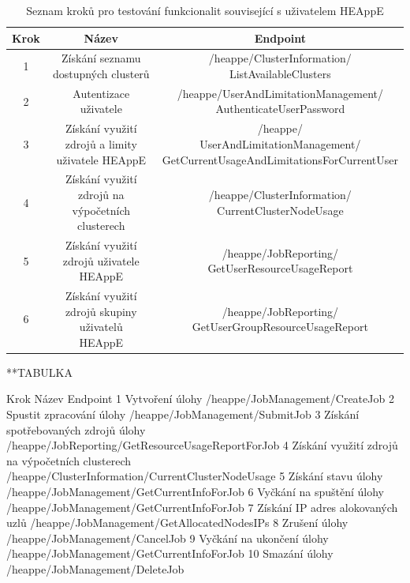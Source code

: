 \begin{table}
	\centering
	\label{tab:TopLevelTableLabel}
		\begin{tabular}{|c|c|c|}
		    \hline
		    Krok & Název & Endpoint \\
		    \hline
			1 & Získání seznamu dostupných clusterů & \specialcell{/heappe/ClusterInformation/\\ListAvailableClusters}\\
			\hline
			2 & Autentizace uživatele & \specialcell{/heappe/UserAndLimitationManagement/\\
			AuthenticateUserPassword}\\
            \hline
			3 & \specialcell{Získání využití zdrojů a limity\\ uživatele HEAppE} & \specialcell{/heappe/\\UserAndLimitationManagement/\\GetCurrentUsageAndLimitationsForCurrentUser}\\
            \hline
            4 & \specialcell{Získání využití zdrojů na výpočetních \\clusterech} & 	\specialcell{/heappe/ClusterInformation/\\CurrentClusterNodeUsage}\\
            \hline
            5 & Získání využití zdrojů uživatele HEAppE & \specialcell{/heappe/JobReporting/\\GetUserResourceUsageReport}\\
            \hline
            6 & \specialcell{Získání využití zdrojů skupiny uživatelů\\HEAppE} & \specialcell{/heappe/JobReporting/\\GetUserGroupResourceUsageReport}\\
            \hline
		\end{tabular}
	\caption{Seznam kroků pro testování funkcionalit související s uživatelem HEAppE}
\end{table}

**TABULKA

Krok	Název	Endpoint
1	Vytvoření úlohy	/heappe/JobManagement/CreateJob
2	Spustit zpracování úlohy	/heappe/JobManagement/SubmitJob
3	Získání spotřebovaných zdrojů úlohy	/heappe/JobReporting/GetResourceUsageReportForJob
4	Získání využití zdrojů na výpočetních clusterech	/heappe/ClusterInformation/CurrentClusterNodeUsage
5	Získání stavu úlohy	/heappe/JobManagement/GetCurrentInfoForJob
6	Vyčkání na spuštění úlohy	/heappe/JobManagement/GetCurrentInfoForJob
7	Získání IP adres alokovaných uzlů	/heappe/JobManagement/GetAllocatedNodesIPs
8	Zrušení úlohy	/heappe/JobManagement/CancelJob
9	Vyčkání na ukončení úlohy	/heappe/JobManagement/GetCurrentInfoForJob
10	Smazání úlohy	/heappe/JobManagement/DeleteJob



